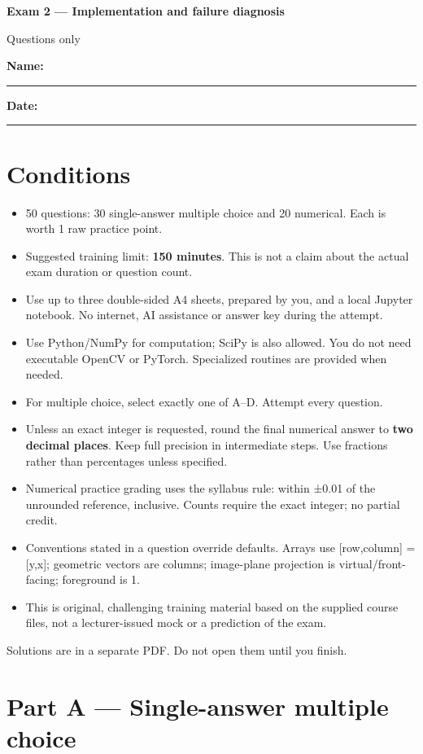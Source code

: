 \documentclass[11pt,a4paper]{article}
\begin{document}
{\LARGE\bfseries Exam 2 — Implementation and failure diagnosis}\par
{\large Questions only}\par\bigskip
\textbf{Name:} \rule{70mm}{0.4pt}\hfill \textbf{Date:} \rule{30mm}{0.4pt}
\section*{Conditions}
\begin{itemize}[leftmargin=5mm,itemsep=5pt]
\item 50 questions: 30 single-answer multiple choice and 20 numerical. Each is worth 1 raw practice point.
\item Suggested training limit: \textbf{150 minutes}. This is not a claim about the actual exam duration or question count.
\item Use up to three double-sided A4 sheets,\allowbreak{} prepared by you,\allowbreak{} and a local Jupyter notebook. No internet,\allowbreak{} AI assistance or answer key during the attempt.
\item Use Python/\allowbreak{}NumPy for computation; SciPy is also allowed. You do not need executable OpenCV or PyTorch. Specialized routines are provided when needed.
\item For multiple choice,\allowbreak{} select exactly one of A–D. Attempt every question.
\item Unless an exact integer is requested,\allowbreak{} round the final numerical answer to \textbf{two decimal places}. Keep full precision in intermediate steps. Use fractions rather than percentages unless specified.
\item Numerical practice grading uses the syllabus rule: within ±0.01 of the unrounded reference,\allowbreak{} inclusive. Counts require the exact integer; no partial credit.
\item Conventions stated in a question override defaults. Arrays use [row,\allowbreak{}column] =\allowbreak{} [y,\allowbreak{}x]; geometric vectors are columns; image-plane projection is virtual/\allowbreak{}front-facing; foreground is 1.
\item This is original,\allowbreak{} challenging training material based on the supplied course files,\allowbreak{} not a lecturer-issued mock or a prediction of the exam.
\end{itemize}
Solutions are in a separate PDF. Do not open them until you finish.
\clearpage\section*{Part A — Single-answer multiple choice}
\end{document}
